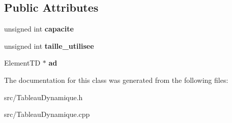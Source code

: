 \subsection*{Public Attributes}
\begin{DoxyCompactItemize}
\item 
\mbox{\label{classTableauDynamique_a7ddd455f3dc2f3d94093177025945936}} 
unsigned int {\bfseries capacite}
\item 
\mbox{\label{classTableauDynamique_ae55063c3127e7ee9390e572fb0ed3a58}} 
unsigned int {\bfseries taille\+\_\+utilisee}
\item 
\mbox{\label{classTableauDynamique_a5d63738b63b1aaabf4e1ab8a7d705032}} 
Element\+TD $\ast$ {\bfseries ad}
\end{DoxyCompactItemize}


The documentation for this class was generated from the following files\+:\begin{DoxyCompactItemize}
\item 
src/Tableau\+Dynamique.\+h\item 
src/Tableau\+Dynamique.\+cpp\end{DoxyCompactItemize}
